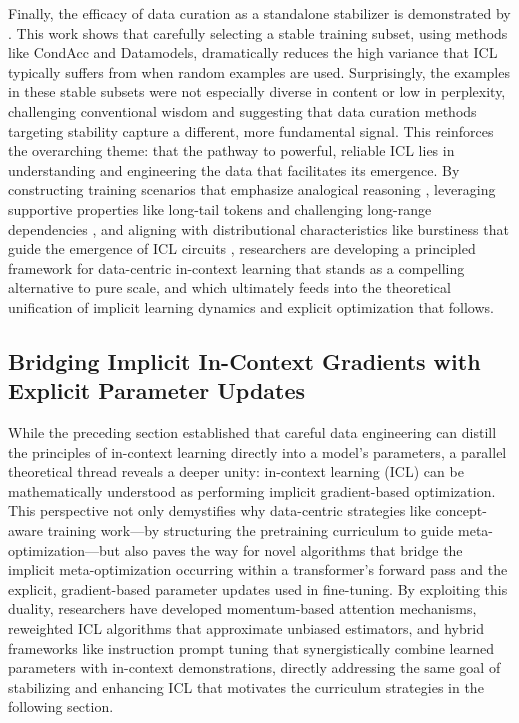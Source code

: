 \documentclass[11pt]{article}
\begin{document}
Finally, the efficacy of data curation as a standalone stabilizer is demonstrated by \cite{ref34}. This work shows that carefully selecting a stable training subset, using methods like CondAcc and Datamodels, dramatically reduces the high variance that ICL typically suffers from when random examples are used. Surprisingly, the examples in these stable subsets were not especially diverse in content or low in perplexity, challenging conventional wisdom and suggesting that data curation methods targeting stability capture a different, more fundamental signal. This reinforces the overarching theme: that the pathway to powerful, reliable ICL lies in understanding and engineering the data that facilitates its emergence. By constructing training scenarios that emphasize analogical reasoning \cite{ref68}, leveraging supportive properties like long-tail tokens and challenging long-range dependencies \cite{ref41}, and aligning with distributional characteristics like burstiness that guide the emergence of ICL circuits \cite{ref55}, researchers are developing a principled framework for data-centric in-context learning that stands as a compelling alternative to pure scale, and which ultimately feeds into the theoretical unification of implicit learning dynamics and explicit optimization that follows.

\subsection{Bridging Implicit In-Context Gradients with Explicit Parameter Updates}

While the preceding section established that careful data engineering can distill the principles of in-context learning directly into a model's parameters, a parallel theoretical thread reveals a deeper unity: in-context learning (ICL) can be mathematically understood as performing implicit gradient-based optimization. This perspective not only demystifies why data-centric strategies like concept-aware training work---by structuring the pretraining curriculum to guide meta-optimization---but also paves the way for novel algorithms that bridge the implicit meta-optimization occurring within a transformer's forward pass and the explicit, gradient-based parameter updates used in fine-tuning. By exploiting this duality, researchers have developed momentum-based attention mechanisms, reweighted ICL algorithms that approximate unbiased estimators, and hybrid frameworks like instruction prompt tuning that synergistically combine learned parameters with in-context demonstrations, directly addressing the same goal of stabilizing and enhancing ICL that motivates the curriculum strategies in the following section.
\end{document}
